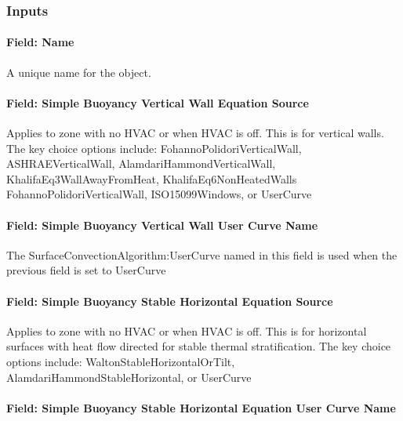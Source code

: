 \subsubsection{Inputs}\label{inputs-6}

\paragraph{Field: Name}\label{field-name-5}

A unique name for the object.

\paragraph{Field: Simple Buoyancy Vertical Wall Equation Source}\label{field-simple-buoyancy-vertical-wall-equation-source}

Applies to zone with no HVAC or when HVAC is off. This is for vertical walls. The key choice options include: FohannoPolidoriVerticalWall, ASHRAEVerticalWall, AlamdariHammondVerticalWall, KhalifaEq3WallAwayFromHeat, KhalifaEq6NonHeatedWalls FohannoPolidoriVerticalWall, ISO15099Windows, or UserCurve

\paragraph{Field: Simple Buoyancy Vertical Wall User Curve Name}\label{field-simple-buoyancy-vertical-wall-user-curve-name}

The SurfaceConvectionAlgorithm:UserCurve named in this field is used when the previous field is set to UserCurve

\paragraph{Field: Simple Buoyancy Stable Horizontal Equation Source}\label{field-simple-buoyancy-stable-horizontal-equation-source}

Applies to zone with no HVAC or when HVAC is off. This is for horizontal surfaces with heat flow directed for stable thermal stratification. The key choice options include: WaltonStableHorizontalOrTilt, AlamdariHammondStableHorizontal, or UserCurve

\paragraph{Field: Simple Buoyancy Stable Horizontal Equation User Curve Name}\label{field-simple-buoyancy-stable-horizontal-equation-user-curve-name}

